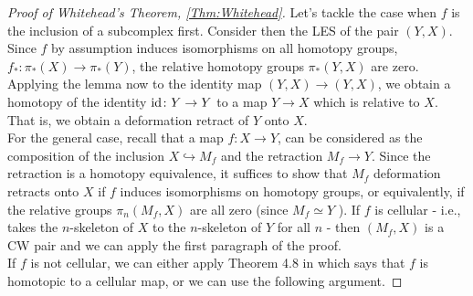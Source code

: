 \begin{proof}[Proof of Whitehead's Theorem, \ref{Thm:Whitehead}]
    Let's tackle the case when $f$ is the inclusion
    of a subcomplex first. Consider then
    the LES of the pair $\left( Y,X \right) $. Since
    $f$ by assumption induces isomorphisms
    on all homotopy groups,
    $f_* \colon \pi_* (X) \to \pi_* (Y)$, the
    relative homotopy groups
    $\pi_* (Y,X)$ are zero. Applying the lemma now
    to the identity map $\left( Y,X \right) \to 
    \left( Y,X \right) $, we obtain a homotopy
    of the identity  ${\mathrm{id}} \colon Y \to Y$ to
    a map $Y \to X$ which is relative to
    $X$. That is, we obtain a deformation retract of
    $Y$ onto $X$.\\
    \linebreak
    For the general case, recall that
    a map $f \colon X \to Y$, can be considered
    as the composition of the
    inclusion $X \hookrightarrow M_f$ and the
    retraction $M_f \to Y$. Since
    the retraction is a homotopy equivalence,
    it suffices to show that $M_f$ deformation retracts
    onto $X$ if $f$ induces isomorphisms on homotopy
    groups, or equivalently, if the relative groups
    $\pi_n \left( M_f, X \right) $ are all zero (since
    $M_f \simeq Y$ ).
    If $f$ is cellular - i.e., takes the $n$-skeleton of
    $X$ to the $n$-skeleton of $Y$ for all
    $n$ - then $\left( M_f, X \right) $ is a CW pair and
    we can apply the first paragraph of the proof.\\
    If $f$ is not cellular, we can either apply
    Theorem 4.8 in \cite{Hatcher} which says
    that $f$ is homotopic to a cellular map, or we can use
    the following argument.


\end{proof}
